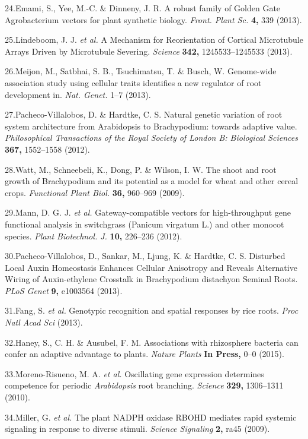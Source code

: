 \documentclass[]{article}
\begin{document}
24.Emami, S., Yee, M.-C. \& Dinneny, J. R. A robust family of Golden
Gate Agrobacterium vectors for plant synthetic biology. \emph{Front.
Plant Sc.} \textbf{4,} 339 (2013).

25.Lindeboom, J. J. \emph{et al.} A Mechanism for Reorientation of
Cortical Microtubule Arrays Driven by Microtubule Severing.
\emph{Science} \textbf{342,} 1245533--1245533 (2013).

26.Meijon, M., Satbhai, S. B., Tsuchimatsu, T. \& Busch, W. Genome-wide
association study using cellular traits identifies a new regulator of
root development in. \emph{Nat. Genet.} 1--7 (2013).

27.Pacheco-Villalobos, D. \& Hardtke, C. S. Natural genetic variation of
root system architecture from Arabidopsis to Brachypodium: towards
adaptive value. \emph{Philosophical Transactions of the Royal Society of
London B: Biological Sciences} \textbf{367,} 1552--1558 (2012).

28.Watt, M., Schneebeli, K., Dong, P. \& Wilson, I. W. The shoot and
root growth of Brachypodium and its potential as a model for wheat and
other cereal crops. \emph{Functional Plant Biol.} \textbf{36,} 960--969
(2009).

29.Mann, D. G. J. \emph{et al.} Gateway-compatible vectors for
high-throughput gene functional analysis in switchgrass (Panicum
virgatum L.) and other monocot species. \emph{Plant Biotechnol. J.}
\textbf{10,} 226--236 (2012).

30.Pacheco-Villalobos, D., Sankar, M., Ljung, K. \& Hardtke, C. S.
Disturbed Local Auxin Homeostasis Enhances Cellular Anisotropy and
Reveals Alternative Wiring of Auxin-ethylene Crosstalk in Brachypodium
distachyon Seminal Roots. \emph{PLoS Genet} \textbf{9,} e1003564 (2013).

31.Fang, S. \emph{et al.} Genotypic recognition and spatial responses by
rice roots. \emph{Proc Natl Acad Sci} (2013).

32.Haney, S., C. H. \& Ausubel, F. M. Associations with rhizosphere
bacteria can confer an adaptive advantage to plants. \emph{Nature
Plants} \textbf{In Press,} 0--0 (2015).

33.Moreno-Risueno, M. A. \emph{et al.} Oscillating gene expression
determines competence for periodic \emph{Arabidopsis} root branching.
\emph{Science} \textbf{329,} 1306--1311 (2010).

34.Miller, G. \emph{et al.} The plant NADPH oxidase RBOHD mediates rapid
systemic signaling in response to diverse stimuli. \emph{Science
Signaling} \textbf{2,} ra45 (2009).
\end{document}
